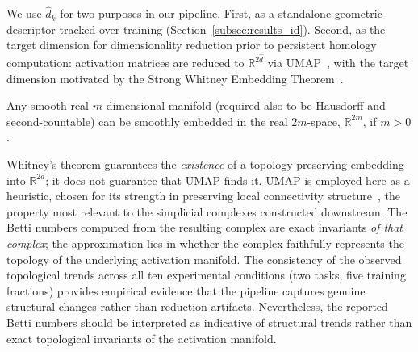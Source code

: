 We use $\hat{d}_k$ for two purposes in our pipeline. First, as a standalone geometric descriptor tracked over training (Section~\ref{subsec:results_id}). Second, as the target dimension for dimensionality reduction prior to persistent homology computation: activation matrices are reduced to $\mathbb{R}^{2\hat{d}}$ via UMAP~\cite{McInnes2018}, with the target dimension motivated by the Strong Whitney Embedding Theorem~\cite{whitney1944self}.

\begin{theorem}
    Any smooth real $m$-dimensional manifold (required also to be Hausdorff and second-countable) can be smoothly embedded in the real $2m$-space, $\mathbb{R}^{2m}$, if $m > 0$.
\end{theorem}

Whitney's theorem guarantees the \emph{existence} of a topology-preserving embedding into $\mathbb{R}^{2d}$; it does not guarantee that UMAP finds it. UMAP is employed here as a heuristic, chosen for its strength in preserving local connectivity structure~\cite{McInnes2018}, the property most relevant to the simplicial complexes constructed downstream. The Betti numbers computed from the resulting complex are exact invariants \emph{of that complex}; the approximation lies in whether the complex faithfully represents the topology of the underlying activation manifold. The consistency of the observed topological trends across all ten experimental conditions (two tasks, five training fractions) provides empirical evidence that the pipeline captures genuine structural changes rather than reduction artifacts. Nevertheless, the reported Betti numbers should be interpreted as indicative of structural trends rather than exact topological invariants of the activation manifold.